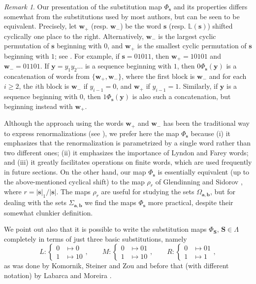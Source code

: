 \documentclass[11pt]{amsart}
\theoremstyle{definition}
\theoremstyle{remark}
\newtheorem{remark}[theorem]{Remark}
\numberwithin{equation}{section}
\renewcommand{\L}{\ensuremath{\mathbb{L}}}
\renewcommand{\a}{ {\mathbf{a}}}
\renewcommand{\b}{ {\mathbf{b}}}
\newcommand{\s}{ {\mathbf{s}}}
\newcommand{\cs}{ {\mathbf{S}}}
\newcommand{\w}{\mathbf{w}}
\newcommand{\y}{\mathbf{y}}
\renewcommand{\a}{ \mathbf{a}}
\newcommand{\La}{\Lambda}
\begin{document}
\begin{remark}
Our presentation of the substitution map $\Phi_\s$ and its properties differs somewhat from the substitutions used by most authors, but can be seen to be equivalent. Precisely, let $\w_+$ (resp. $\w_-$) be the word $\s$ (resp. $\L(\s)$) shifted cyclically one place to the right.
Alternatively, $\w_-$ is the largest cyclic permutation of $\s$ beginning with $0$, and $\w_+$ is the smallest cyclic permutation of $\s$ beginning with $1$; see \cite{Glendinning-Sidorov-2015}. For example, if $\s=01011$, then $\w_+={10101}$ and $\w_-=01101$.
If $\y=y_1y_2\dots$ is a sequence beginning with $1$, then $0\Phi_\s(\y)$ is a concatenation of words from $\{\w_+,\w_-\}$, where the first block is $\w_-$ and for each $i\geq 2$, the $i$th block is $\w_-$ if $y_{i-1}=0$, and $\w_+$ if $y_{i-1}=1$. Similarly, if $\y$ is a sequence beginning with $0$, then $1\Phi_\s(\y)$ is also such a concatenation, but beginning instead with $\w_+$.

Although the approach using the words $\w_+$ and $\w_-$ has been the traditional way to express renormalizations (see \cite{Hubbard-Sparrow-1990}), we prefer here the map $\Phi_\s$ because (i) it emphasizes that the renormalization is parametrized by a single word rather than two different ones; (ii) it emphasizes the importance of Lyndon and Farey words; and (iii) it greatly facilitates operations on finite words, which are used frequently in future sections. On the other hand, our map $\Phi_\s$ is essentially equivalent (up to the above-mentioned cyclical shift) to the map $\rho_r$ of Glendinning and Sidorov \cite{Glendinning-Sidorov-2015}, where $r=|\s|_1/|\s|$. The maps $\rho_r$ are useful for studying the sets $\Omega_{\a,\b}$, but for dealing with the sets $\Sigma_{\a,\b}$ we find the maps $\Phi_\s$ more practical, despite their somewhat clunkier definition.

We point out also that it is possible to write the substitution maps $\Phi_\cs$, $\cs\in\La$ completely in terms of just three basic substitutions, namely
\[
L: \begin{cases}0 &\mapsto 0\\ 1 &\mapsto 10\end{cases}, \qquad
M: \begin{cases}0 &\mapsto 01\\ 1 &\mapsto 10\end{cases}, \qquad
R: \begin{cases}0 &\mapsto 01\\ 1 &\mapsto 1\end{cases},
\]
as was done by Komornik, Steiner and Zou \cite{Komornik-Steiner-Zou-2022} and before that (with different notation) by Labarca and Moreira \cite{Labarca-Moreira-2006}.
\end{remark}
\end{document}
